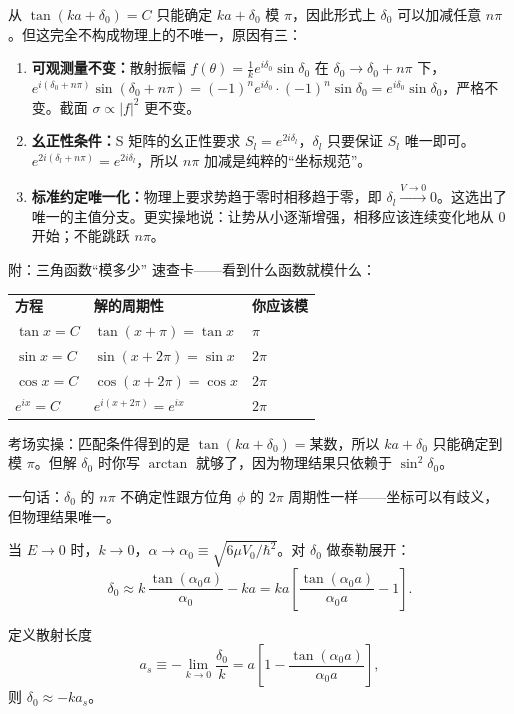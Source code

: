 \begin{derivationbox}
从 $\tan(ka + \delta_0) = C$ 只能确定 $ka + \delta_0$ 模 $\pi$，因此形式上 $\delta_0$ 可以加减任意 $n\pi$。但这完全不构成物理上的不唯一，原因有三：
\begin{enumerate}
    \item \textbf{可观测量不变：}散射振幅 $f(\theta) = \frac{1}{k}e^{i\delta_0}\sin\delta_0$ 在 $\delta_0 \to \delta_0 + n\pi$ 下，$e^{i(\delta_0+n\pi)}\sin(\delta_0 + n\pi) = (-1)^n e^{i\delta_0} \cdot (-1)^n \sin\delta_0 = e^{i\delta_0}\sin\delta_0$，严格不变。截面 $\sigma \propto |f|^2$ 更不变。
    \item \textbf{幺正性条件：}S 矩阵的幺正性要求 $S_l = e^{2i\delta_l}$，$\delta_l$ 只要保证 $S_l$ 唯一即可。$e^{2i(\delta_l + n\pi)} = e^{2i\delta_l}$，所以 $n\pi$ 加减是纯粹的``坐标规范''。
    \item \textbf{标准约定唯一化：}物理上要求势趋于零时相移趋于零，即 $\delta_l \xrightarrow{V \to 0} 0$。这选出了唯一的主值分支。更实操地说：让势从小逐渐增强，相移应该连续变化地从 0 开始；不能跳跃 $n\pi$。
\end{enumerate}

附：三角函数``模多少'' 速查卡——看到什么函数就模什么：

\begin{tabular}{lll}
\textbf{方程} & \textbf{解的周期性} & \textbf{你应该模} \\
$\tan x = C$ & $\tan(x + \pi) = \tan x$ & $\pi$ \\
$\sin x = C$ & $\sin(x + 2\pi) = \sin x$ & $2\pi$ \\
$\cos x = C$ & $\cos(x + 2\pi) = \cos x$ & $2\pi$ \\
$e^{ix} = C$ & $e^{i(x+2\pi)} = e^{ix}$ & $2\pi$ \\
\end{tabular}

考场实操：匹配条件得到的是 $\tan(ka + \delta_0) = \text{某数}$，所以 $ka + \delta_0$ 只能确定到模 $\pi$。但解 $\delta_0$ 时你写 $\arctan$ 就够了，因为物理结果只依赖于 $\sin^2\delta_0$。

一句话：$\delta_0$ 的 $n\pi$ 不确定性跟方位角 $\phi$ 的 $2\pi$ 周期性一样——坐标可以有歧义，但物理结果唯一。
\end{derivationbox}

\begin{derivationbox}[低能极限 $E \to 0$]
当 $E \to 0$ 时，$k \to 0$，$\alpha \to \alpha_0 \equiv \sqrt{6\mu V_0/\hbar^2}$。对 $\delta_0$ 做泰勒展开：
\[
\delta_0 \approx k\, \frac{\tan(\alpha_0 a)}{\alpha_0} - ka = ka \left[ \frac{\tan(\alpha_0 a)}{\alpha_0 a} - 1 \right].
\]

定义散射长度
\[
a_s \equiv -\lim_{k\to 0} \frac{\delta_0}{k} = a \left[ 1 - \frac{\tan(\alpha_0 a)}{\alpha_0 a} \right],
\]
则 $\delta_0 \approx -k a_s$。
\end{derivationbox}

